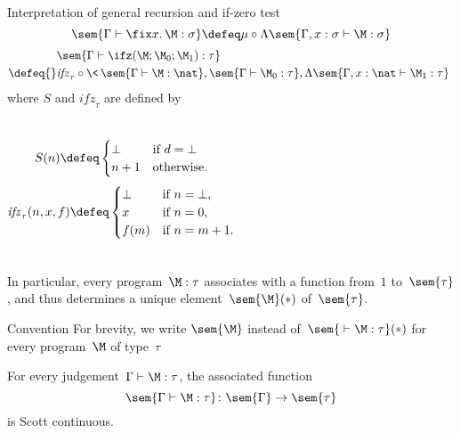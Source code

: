 \begin{frame}{Interpretation of general recursion and if-zero test}
  \[
    \sem{\Gamma \vdash \fix x.\, \M : \sigma} \defeq
    \mu \circ \Lambda\sem{\Gamma, x : \sigma \vdash \M : \sigma}
  \]
  \begin{align*}
    & \sem{\Gamma \vdash \ifz(\M; \M_0; \M_1) : \tau} \\
    \defeq{} & \mathit{ifz}_\tau \circ \<\,
    \sem{\Gamma \vdash \M  : \nat},
    \sem{\Gamma \vdash \M_0 : \tau},
    \Lambda\sem{\Gamma, x : \nat \vdash \M_1 : \tau}\,\>
  \end{align*}
  where $S$ and $\mathit{ifz}_\tau$ are defined by
  \begin{columns}
      \[
        S(n) \defeq
        \begin{cases}
          \bot & \text{if $d = \bot$} \\
          n + 1 & \text{otherwise.}
        \end{cases}
      \]
      \[
        \mathit{ifz}_\tau(n, x, f) \defeq
        \begin{cases}
          \bot & \text{if $n = \bot$,} \\
          x   & \text{if $n = 0$,} \\
          f(m) & \text{if $n = m +1$.} \\
        \end{cases}
      \]
  \end{columns}
\end{frame}

\begin{frame}
  In particular, every program~$\M:\tau$ associates with a function from~$1$
  to~$\sem{\tau}$, and thus determines a unique element~$\sem{\M}(*)$
  of~$\sem{\tau}$. 
  \begin{block}{Convention}
    For brevity, we write $\sem{\M}$ instead of~$\sem{{}\vdash\M : \tau}(*)$ for
    every program~$\M$ of type~$\tau$
  \end{block}
  \begin{theorem}
    For every judgement~$\Gamma \vdash \M:\tau$, 
    the associated function
    \[
      \sem{\Gamma \vdash \M : \tau} \colon \sem{\Gamma} \to \sem{\tau}
    \]
    is Scott continuous. 
  \end{theorem}
\end{frame}


